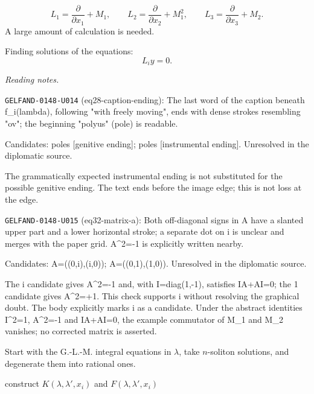 \begin{equation*}
L_1=\frac{\partial}{\partial x_1}+M_1,\qquad
L_2=\frac{\partial}{\partial x_2}+M_1^2,\qquad
L_3=\frac{\partial}{\partial x_3}+M_2.
\end{equation*}
A large amount of calculation is needed.

Finding solutions of the equations:
\begin{equation*}
L_i y=0. \tag{33}
\end{equation*}


\par\smallskip\noindent\textit{Reading notes.}\par
\noindent\texttt{GELFAND-0148-U014} (eq28-caption-ending): The last word of the caption beneath f\_i(lambda), following "with freely moving", ends with dense strokes resembling "ov"; the beginning "polyus" (pole) is readable.\par
Candidates: poles [genitive ending]; poles [instrumental ending]. Unresolved in the diplomatic source.\par
The grammatically expected instrumental ending is not substituted for the possible genitive ending. The text ends before the image edge; this is not loss at the edge.\par
\noindent\texttt{GELFAND-0148-U015} (eq32-matrix-a): Both off-diagonal signs in A have a slanted upper part and a lower horizontal stroke; a separate dot on i is unclear and merges with the paper grid. A\textasciicircum{}2=-1 is explicitly written nearby.\par
Candidates: A=((0,i),(i,0)); A=((0,1),(1,0)). Unresolved in the diplomatic source.\par
The i candidate gives A\textasciicircum{}2=-1 and, with I=diag(1,-1), satisfies IA+AI=0; the 1 candidate gives A\textasciicircum{}2=+1. This check supports i without resolving the graphical doubt. The body explicitly marks i as a candidate. Under the abstract identities I\textasciicircum{}2=1, A\textasciicircum{}2=-1 and IA+AI=0, the example commutator of M\_1 and M\_2 vanishes; no corrected matrix is asserted.\par


Start with the G.-L.-M. integral equations in $\lambda$, take $n$-soliton solutions, and degenerate them into rational ones.

\begin{center}
\end{center}
construct $K(\lambda,\lambda',x_i)$ and $F(\lambda,\lambda',x_i)$

